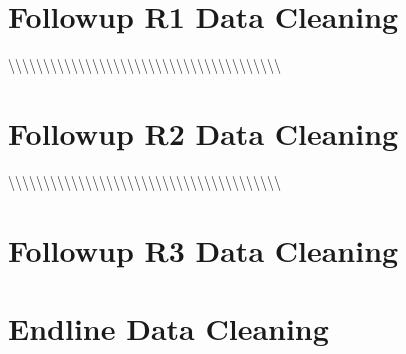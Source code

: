 \documentclass[
]{article}
\begin{document}
\newpage

\hypertarget{followup-r1-data-cleaning}{%
\section{Followup R1 Data Cleaning}\label{followup-r1-data-cleaning}}

\textbackslash\textbackslash\textbackslash\textbackslash\textbackslash\textbackslash\textbackslash\textbackslash\textbackslash\textbackslash\textbackslash\textbackslash\textbackslash\textbackslash\textbackslash\textbackslash\textbackslash\textbackslash\textbackslash\textbackslash\textbackslash\textbackslash\textbackslash\textbackslash\textbackslash\textbackslash\textbackslash\textbackslash\textbackslash\textbackslash\textbackslash\textbackslash\textbackslash\textbackslash\textbackslash\textbackslash\textbackslash\textbackslash\textbackslash{}

\newpage

\hypertarget{followup-r2-data-cleaning}{%
\section{Followup R2 Data Cleaning}\label{followup-r2-data-cleaning}}

\textbackslash\textbackslash\textbackslash\textbackslash\textbackslash\textbackslash\textbackslash\textbackslash\textbackslash\textbackslash\textbackslash\textbackslash\textbackslash\textbackslash\textbackslash\textbackslash\textbackslash\textbackslash\textbackslash\textbackslash\textbackslash\textbackslash\textbackslash\textbackslash\textbackslash\textbackslash\textbackslash\textbackslash\textbackslash\textbackslash\textbackslash\textbackslash\textbackslash\textbackslash\textbackslash\textbackslash\textbackslash\textbackslash\textbackslash{}

\newpage

\hypertarget{followup-r3-data-cleaning}{%
\section{Followup R3 Data Cleaning}\label{followup-r3-data-cleaning}}

\newpage

\hypertarget{endline-data-cleaning}{%
\section{Endline Data Cleaning}\label{endline-data-cleaning}}
\end{document}
